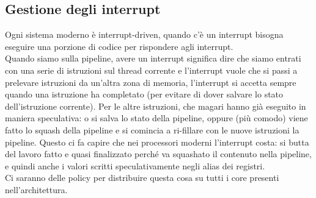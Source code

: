 \documentclass[14pt]{article}
\begin{document}
\subsection{Gestione degli interrupt}
Ogni sistema moderno è interrupt-driven, quando c'è un interrupt bisogna eseguire una porzione di codice per rispondere agli interrupt.\\ Quando siamo sulla pipeline, avere un interrupt significa dire che siamo entrati con una serie di istruzioni sul thread corrente e l'interrupt vuole che si passi a prelevare istruzioni da un'altra zona di memoria, l'interrupt si accetta sempre quando una istruzione ha completato (per evitare di dover salvare lo stato dell'istruzione corrente). Per le altre istruzioni, che magari hanno già eseguito in maniera speculativa: o si salva lo stato della pipeline, oppure (più comodo) viene fatto lo squash della pipeline e si comincia a ri-fillare con le nuove istruzioni la pipeline. Questo ci fa capire che nei processori moderni l'interrupt costa: si butta del lavoro fatto e quasi finalizzato perché va squashato il contenuto nella pipeline, e quindi anche i valori scritti speculativamente negli alias dei registri.\\ Ci saranno delle policy per distribuire questa cosa su tutti i core presenti nell'architettura.
\end{document}
